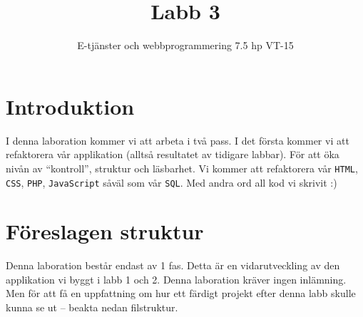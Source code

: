 \documentclass[12pt]{article}
\date{}
\title{ Labb 3 }
\author{ E-tjänster och webbprogrammering 7.5 hp VT-15 }
\begin{document}
\maketitle
\vspace{-2em}



\section{Introduktion}
I denna laboration kommer vi att arbeta i två pass. I det första kommer vi att refaktorera vår applikation (alltså resultatet av tidigare labbar). För att öka nivån av ``kontroll'', struktur och läsbarhet. Vi kommer att refaktorera vår \texttt{HTML}, \texttt{CSS}, \texttt{PHP}, \texttt{JavaScript} såväl som vår \texttt{SQL}. Med andra ord all kod vi skrivit :)


\pagebreak
\section{Föreslagen struktur}
Denna laboration består endast av 1 fas. Detta är en vidarutveckling av den applikation vi byggt i labb 1 och 2. Denna laboration kräver ingen inlämning. Men för att få en uppfattning om hur ett färdigt projekt efter denna labb skulle kunna se ut -- beakta nedan filstruktur.
\end{document}
